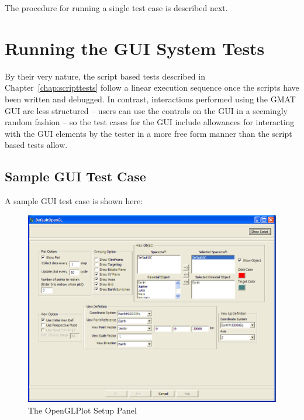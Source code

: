 The procedure for running a single test case is described next.

\section{\label{section:RunningGuiTests}Running the GUI System Tests}

By their very nature, the script based tests described in Chapter~\ref{chap:scripttests} follow a
linear execution sequence once the scripts have been written and debugged.  In contrast,
interactions performed using the GMAT GUI are less structured -- users can use the controls on the
GUI in a seemingly random fashion -- so the test cases for the GUI include allowances for
interacting with the GUI elements by the tester in a more free form manner than the script based
tests allow.

\subsection{Sample GUI Test Case}

A sample GUI test case is shown here:

\begin{quote}
\end{quote}

\begin{figure}[htb]
\begin{center}
\includegraphics[300,235]{Images/OpenGLPanel.png}
\caption{\label{figure:openGLPanel}The OpenGLPlot Setup Panel}
\end{center}
\end{figure}

